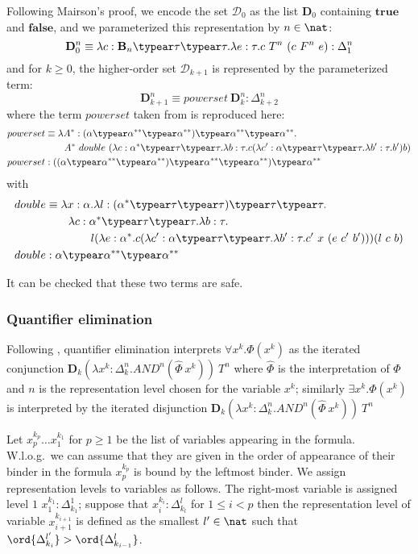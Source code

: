 Following Mairson's  proof, we encode the set $\mathcal{D}_0$ as the list $\mathbf{D}_0$ containing $\mathbf{true}$ and $\mathbf{false}$, and we parameterized this representation by $n\in \nat$:
$$\mathbf{D}_0^n \equiv \lambda c:\booltype_n \typear \tau \typear \tau . \lambda e : \tau . c~T^n~(c~F^n~e) : \Delta_1^n$$
and for $k\geq 0$, the higher-order set $\mathcal{D}_{k+1}$ is represented by the parameterized term:
$$\mathbf{D}_{k+1}^n \equiv powerset~\mathbf{D}_k^n : \Delta_{k+2}^n$$
where the term $powerset$ taken from \cite{mairson1992spt} is reproduced here:
\begin{align*}
  powerset &\equiv \lambda A^* :(\alpha \typear \alpha^{**} \typear \alpha^{**}) \typear \alpha^{**} \typear \alpha^{**}.\\
&\qquad  A^*~double~(\lambda c:\alpha^* \typear \tau\typear \tau.\lambda b:\tau . c ( \lambda c':\alpha\typear \tau\typear \tau. \lambda b':\tau.b') b)\\
powerset &: ((\alpha \typear \alpha^{**} \typear \alpha^{**}) \typear \alpha^{**} \typear \alpha^{**})\typear \alpha^{**}
\end{align*}
with
\begin{align*}
  double &\equiv \lambda x :\alpha.\lambda l : (\alpha^* \typear \tau\typear \tau)\typear \tau\typear \tau. \\
  & \qquad \lambda c:\alpha^*\typear \tau\typear \tau.\lambda b:\tau. \\
  & \qquad \qquad l(\lambda e:\alpha^*.c (\lambda c':\alpha\typear \tau\typear \tau.\lambda b':\tau.c'~x~(e~c'~b')))(l~c~b)\\
double &: \alpha \typear \alpha^{**} \typear \alpha^{**}
\end{align*}

It can be checked that these two terms are safe.

\subsubsection{Quantifier elimination}
Following \cite{mairson1992spt}, quantifier elimination interprets $\forall x^k.\Phi(x^k)$ as the iterated conjunction $\mathbf{D}_k(\lambda x^k:\Delta_k^n.AND^n(\hat\Phi~x^k))~T^n$ where $\hat\Phi$ is the interpretation of $\Phi$
and $n$ is the representation level chosen for the variable $x^k$; similarly $\exists x^k.\Phi(x^k)$  is interpreted by the iterated disjunction $\mathbf{D}_k(\lambda x^k:\Delta_k^n.AND^n(\hat\Phi~x^k))~T^n$

Let $x^{k_p}_p \ldots x^{k_1}_1$ for $p\geq1$ be the list of variables appearing in the formula. W.l.o.g.\ we can assume that they are given in the order of appearance of their binder in the formula \ie $x^{k_p}_p$ is bound by the leftmost binder. We assign representation levels to variables as follows. The right-most variable is assigned level $1$ \ie $x^{k_1}_1 : \Delta^1_{k_1}$; suppose that $x^{k_i}_i :\Delta^l_{k_l}$ for $1\leq i< p$ then the representation level of variable $x^{k_{i+1}}_{i+1}$ is defined as
the smallest $l'\in\nat$ such that $\ord{\Delta^{l'}_{k_i}} > \ord{\Delta^{l}_{k_{i-1}}}$.

